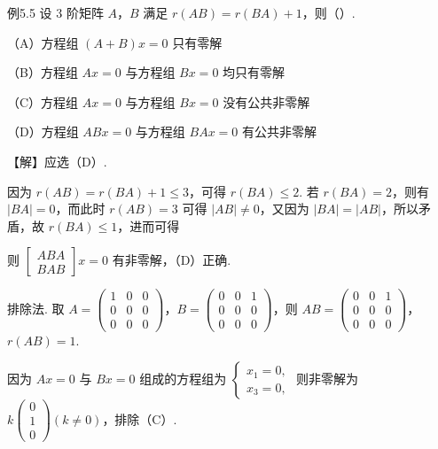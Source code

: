\begin{fcard}{例5.5}
设 3 阶矩阵 $A$，$B$ 满足 $r(AB)=r(BA)+1$，则（\quad）.

（A）方程组 $(A+B)x=0$ 只有零解

（B）方程组 $Ax=0$ 与方程组 $Bx=0$ 均只有零解

（C）方程组 $Ax=0$ 与方程组 $Bx=0$ 没有公共非零解

（D）方程组 $ABx=0$ 与方程组 $BAx=0$ 有公共非零解

【解】应选（D）.

因为 $r(AB)=r(BA)+1\le3$，可得 $r(BA)\le2$. 若 $r(BA)=2$，则有 $|BA|=0$，而此时 $r(AB)=3$ 可得 $|AB|\ne0$，又因为 $|BA|=|AB|$，所以矛盾，故 $r(BA)\le1$，进而可得


则 $\begin{bmatrix}ABA\\BAB\end{bmatrix}x=0$ 有非零解，（D）正确.

排除法. 取 $A=\begin{pmatrix}1&0&0\\0&0&0\\0&0&0\end{pmatrix}$，$B=\begin{pmatrix}0&0&1\\0&0&0\\0&0&0\end{pmatrix}$，则 $AB=\begin{pmatrix}0&0&1\\0&0&0\\0&0&0\end{pmatrix}$，$r(AB)=1$.




因为 $Ax=0$ 与 $Bx=0$ 组成的方程组为 $\begin{cases}x_1=0,\\x_3=0,\end{cases}$ 则非零解为 $k\begin{pmatrix}0\\1\\0\end{pmatrix}(k\ne0)$，排除（C）.
\end{fcard}


